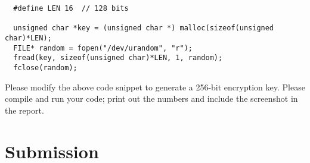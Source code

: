 \begin{lstlisting}
  #define LEN 16  // 128 bits

  unsigned char *key = (unsigned char *) malloc(sizeof(unsigned char)*LEN);
  FILE* random = fopen("/dev/urandom", "r");
  fread(key, sizeof(unsigned char)*LEN, 1, random);
  fclose(random);
\end{lstlisting}


Please modify the above code snippet to generate a 256-bit encryption key. Please 
compile and run your code; print out the numbers and 
include the screenshot in the report. 




\section{Submission}





